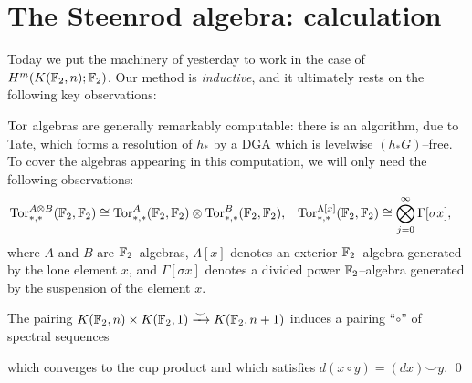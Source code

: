 \section{The Steenrod algebra: calculation}\label{StableSteenrodAlgCalculation}

Today we put the machinery of yesterday to work in the case of $H^m(K(\mathbb F_2, n); \mathbb F_2)$.
Our method is \emph{inductive}, and it ultimately rests on the following key observations:

\begin{example}
$\operatorname{Tor}$ algebras are generally remarkably computable: there is an algorithm, due to Tate, which forms a resolution of $h_*$ by a DGA which is levelwise $(h_* G)$--free.
To cover the algebras appearing in this computation, we will only need the following observations:
\begin{align*}
\operatorname{Tor}^{A \otimes B}_{*, *}(\mathbb F_2, \mathbb F_2) & \cong \operatorname{Tor}^A_{*, *}(\mathbb F_2, \mathbb F_2) \otimes \operatorname{Tor}^B_{*, *}(\mathbb F_2, \mathbb F_2), &
\operatorname{Tor}^{\Lambda[x]}_{*, *}(\mathbb F_2, \mathbb F_2) & \cong \bigotimes_{j=0}^\infty \Gamma[\sigma x],
\end{align*}
where $A$ and $B$ are $\mathbb F_2$--algebras, $\Lambda[x]$ denotes an exterior $\mathbb F_2$--algebra generated by the lone element $x$, and $\Gamma[\sigma x]$ denotes a divided power $\mathbb F_2$--algebra generated by the suspension of the element $x$.
\end{example}

\begin{lemma}
The pairing $K(\mathbb F_2, n) \times K(\mathbb F_2, 1) \xrightarrow\smile K(\mathbb F_2, n+1)$ induces a pairing ``$\circ$'' of spectral sequences
\begin{center}
\end{center}
which converges to the cup product and which satisfies $d(x \circ y) = (dx) \smile y$.
\qed
\end{lemma}

